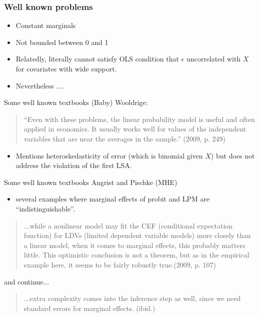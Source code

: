 \documentclass[11pt,dvipsnames,table,aspectratio=169]{beamer}
\begin{document}
\begin{frame}
       \frametitle{Well known problems}
       \begin{itemize}
       \item Constant marginals 
       \item Not bounded between 0 and 1
       \item Relatedly, literally cannot satisfy OLS condition that $\epsilon$ uncorrelated with $X$ for covariates with wide support. 
       \item Nevertheless .... 
       \end{itemize}
\end{frame}

\begin{frame}{Some well known textbooks}
(Baby) Wooldrige:
\begin{quote}
``Even with these problems, the linear probability model is useful and often applied in economics. It usually works well for values of the independent variables that are near the averages in the sample.'' (2009, p. 249)
\end{quote}
\begin{itemize}
\item Mentions heteroskedasticity of error (which is binomial given $X$) but does not address the violation of the first LSA.
\end{itemize}
\end{frame}

\begin{frame}{Some well known textbooks}
Angrist and Pischke (MHE) 
\begin{itemize}
\item several examples where marginal effects of probit and LPM are ``indistinguishable''.
\end{itemize}

\begin{quote}
...while a nonlinear model may fit the CEF (conditional expectation function) for LDVs (limited dependent variable models) more closely than a linear model, when it comes to marginal effects, this probably matters little. This optimistic conclusion is not a theorem, but as in the empirical example here, it seems to be fairly robustly true.(2009, p. 107)
\end{quote}
and continue...
\begin{quote}
...extra complexity comes into the inference step as well, since we need standard errors for marginal effects. (ibid.)
\end{quote}
\end{frame}
\end{document}
